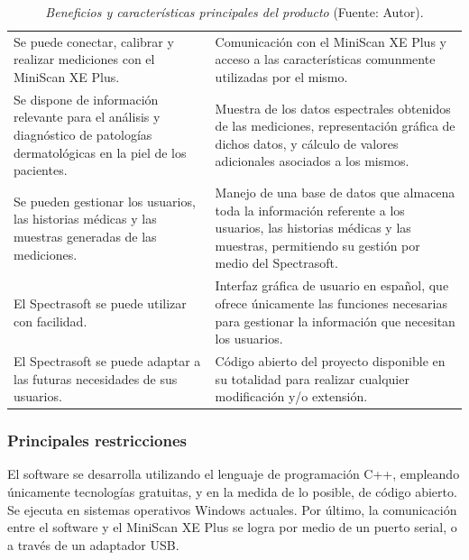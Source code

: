 	\begin{table}[h]
		\small
		\caption[Beneficios y caracter\'{i}sticas principales del producto]{\textit{Beneficios y caracter\'{i}sticas principales del producto} (Fuente: Autor).}
		\centering
		\setlength{\extrarowheight}{\altocelda}
		\begin{tabulary}{\anchotabla}{|J|J|}
			\hline
			 & \\ \hline
			Se puede conectar, calibrar y realizar mediciones con el MiniScan XE Plus. & 
			Comunicaci\'{o}n con el MiniScan XE Plus y acceso a las caracter\'{i}sticas comunmente utilizadas por el mismo.\\ \hline
			Se dispone de informaci\'{o}n relevante para el an\'{a}lisis y diagn\'{o}stico de patolog\'{i}as dermatol\'{o}gicas en la piel de los pacientes. &
			Muestra de los datos espectrales obtenidos de las mediciones, representaci\'{o}n gr\'{a}fica de dichos datos, y c\'{a}lculo de valores adicionales asociados a los mismos.\\ \hline
			Se pueden gestionar los usuarios, las historias m\'{e}dicas y las muestras generadas de las mediciones. &
			Manejo de una base de datos que almacena toda la informaci\'{o}n referente a los usuarios, las historias m\'{e}dicas y las muestras, permitiendo su gesti\'{o}n por medio del Spectrasoft.\\ \hline
			El Spectrasoft se puede utilizar con facilidad. &
			Interfaz gr\'{a}fica de usuario en espa\~{n}ol, que ofrece \'{u}nicamente las funciones necesarias para gestionar la informaci\'{o}n que necesitan los usuarios. \\ \hline
			El Spectrasoft se puede adaptar a las futuras necesidades de sus usuarios. &
			C\'{o}digo abierto del proyecto disponible en su totalidad para realizar cualquier modificaci\'{o}n y/o extensi\'{o}n.\\ \hline
		\end{tabulary}
	\end{table}
	
	\subsubsection{Principales restricciones}
	
	El software se desarrolla utilizando el lenguaje de programaci\'{o}n C++, empleando \'{u}nicamente tecnolog\'{i}as gratuitas, y en la medida de lo posible, de c\'{o}digo abierto. Se ejecuta en sistemas operativos Windows actuales. Por \'{u}ltimo, la comunicaci\'{o}n entre el software y el MiniScan XE Plus se logra por medio de un puerto serial, o a trav\'{e}s de un adaptador USB.
	
